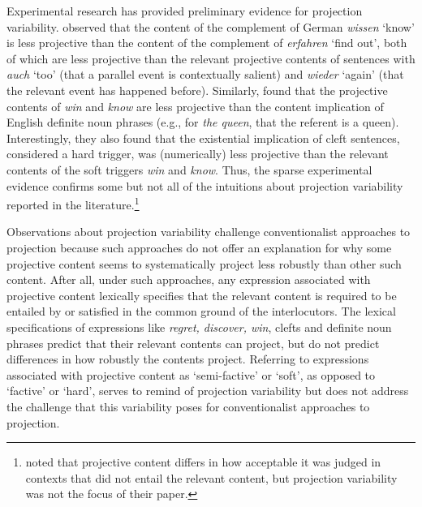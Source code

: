 \documentclass[11pt,fleqn]{article}
\newcommand{\6}{\mbox{$[\hspace*{-.6mm}[$}}
\newcommand{\9}{\mbox{$]\hspace*{-.6mm}]$}}
\begin{document}
Experimental research has provided preliminary evidence for projection variability. \citet{xue-onea11} observed that the content of the complement of German {\em wissen} `know' is less projective than the content of the complement of {\em erfahren} `find out', both of which are less projective than the relevant projective contents of sentences with {\em auch} `too' (that a parallel event is contextually salient) and {\em wieder} `again' (that the relevant event has happened before). Similarly, \citet{smith-hall11} found that the projective contents of {\em win} and {\em know} are less projective than the content implication of English definite noun phrases (e.g., for {\em the queen}, that the referent is a queen). Interestingly, they also found that the existential implication of cleft sentences, considered a hard trigger, was (numerically) less projective than the relevant contents of the soft triggers {\em win} and {\em know}. Thus, the sparse experimental evidence confirms some but not all of the intuitions about projection variability reported in the literature.\footnote{\citet{tiemann-etal11} noted that projective content differs in how acceptable it was judged in contexts that did not entail the relevant content, but projection variability was not the focus of their paper.}

Observations about projection variability challenge conventionalist approaches to projection because such approaches do not offer an explanation for why some projective content seems to systematically project less robustly than other such content. After all, under such approaches, any expression associated with projective content lexically specifies that the relevant content is required to be entailed by or satisfied in the common ground of the interlocutors. The lexical specifications of expressions like {\em regret, discover, win}, clefts and definite noun phrases predict that their relevant contents can project, but do not predict differences in how robustly the contents project. Referring to expressions associated with projective content as `semi-factive' or `soft', as opposed to `factive' or `hard', serves to remind of projection variability but does not address the challenge that this variability poses for conventionalist approaches to projection.
\end{document}
